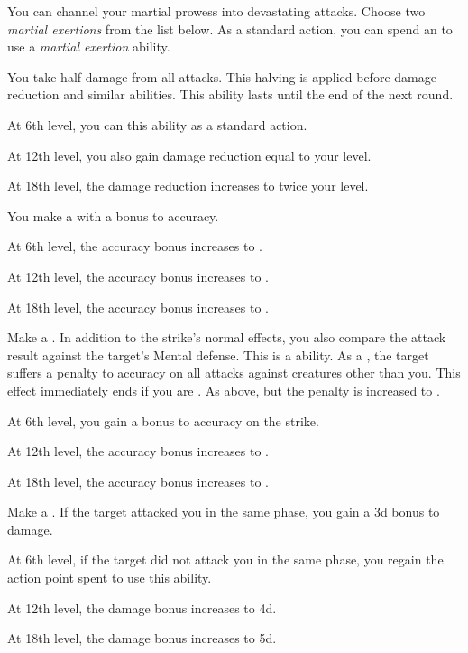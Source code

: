         You can channel your martial prowess into devastating attacks.
        Choose two \textit{martial exertions} from the list below.
        As a standard action, you can spend an  to use a \textit{martial exertion} ability.
        {
             You take half damage from all attacks.
            This halving is applied before damage reduction and similar abilities.
            This ability lasts until the end of the next round.
            \par At 6th level, you can  this ability as a standard action.
            \par At 12th level, you also gain damage reduction equal to your level.
            \par At 18th level, the damage reduction increases to twice your level.

             You make a  with a  bonus to accuracy.
            \par At 6th level, the accuracy bonus increases to .
            \par At 12th level, the accuracy bonus increases to .
            \par At 18th level, the accuracy bonus increases to .

             Make a .
            In addition to the strike's normal effects, you also compare the attack result against the target's Mental defense.
            This is a  ability.
             As a , the target suffers a  penalty to accuracy on all attacks against creatures other than you.
            This effect immediately ends if you are .
             As above, but the penalty is increased to .
            \par At 6th level, you gain a  bonus to accuracy on the strike.
            \par At 12th level, the accuracy bonus increases to .
            \par At 18th level, the accuracy bonus increases to .

             Make a .
            If the target attacked you in the same phase, you gain a \plus3d bonus to damage.
            \par At 6th level, if the target did not attack you in the same phase, you regain the action point spent to use this ability.
            \par At 12th level, the damage bonus increases to \plus4d.
            \par At 18th level, the damage bonus increases to \plus5d.

}
